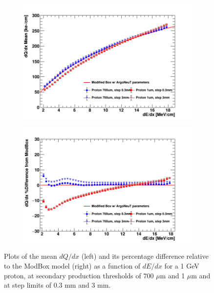 \begin{figure}[bp!]
        \begin{subfigure}[b]{0.495\textwidth}   
            \centering 
            \includegraphics[width=\textwidth]{proton_profile_steplim}
            \caption{}%
            \label{fig:proton_steplim_magnitude}
        \end{subfigure}
        \hfill
        \begin{subfigure}[b]{0.495\textwidth}   
            \centering 
            \includegraphics[width=\textwidth]{proton_profile_diff_steplim}
            \caption{}%
            \label{fig:proton_steplim_diff}
        \end{subfigure}
        \caption{Plots of the mean $dQ/dx$ (left) and its percentage difference relative to the ModBox model (right) as a function of $dE/dx$ for a 1 GeV proton, at secondary production thresholds of 700 $\mu$m and 1 $\mu$m and at step limits of 0.3 mm and 3 mm. }
        \label{fig:proton_steplim}
\end{figure}

